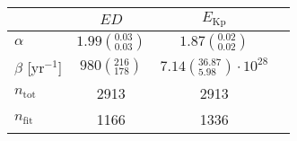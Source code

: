 \begin{tabular}{lccr}
\hline
  &                               $ED$ &                                  $E_\mathrm{Kp}$ \\
\hline
$\alpha$            &  $1.99\left(^{0.03}_{0.03}\right)$ &                $1.87\left(^{0.02}_{0.02}\right)$ \\
$\beta$ [yr$^{-1}$] &     $980\left(^{216}_{178}\right)$ &  $7.14\left(^{36.87}_{5.98}\right)\cdot 10^{28}$ \\
$n_\mathrm{tot}$    &                               2913 &                                             2913 \\
$n_\mathrm{fit}$    &                               1166 &                                             1336 \\
\hline

\end{tabular}
